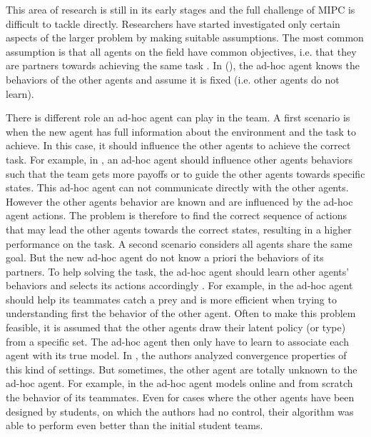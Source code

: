 This area of research is still in its early stages and the full challenge of MIPC is difficult to tackle directly. Researchers have started investigated only certain aspects of the larger problem by making suitable assumptions. The most common assumption is that all agents on the field have common objectives, i.e. that they are partners towards achieving the same task \cite{barrett2011empirical}.  In (\cite{stone2010teach,stone2013teaching}), the ad-hoc agent knows the behaviors of the other agents and assume it is fixed (i.e. other agents do not learn). 

There is different role an ad-hoc agent can play in the team. A first scenario is when the new agent has full information about the environment and the task to achieve. In this case, it should influence the other agents to achieve the correct task. For example, in  \cite{stone2010teach,stone2013teaching}, an ad-hoc agent should influence other agents behaviors such that the team gets more payoffs or to guide the other agents towards specific states. This ad-hoc agent can not communicate directly with the other agents. However the other agents behavior are known and are influenced by the ad-hoc agent actions. The problem is therefore to find the correct sequence of actions that may lead the other agents towards the correct states, resulting in a higher performance on the task. A second scenario considers all agents share the same goal. But the new ad-hoc agent do not know a priori the behaviors of its partners. To help solving the task, the ad-hoc agent should learn other agents' behaviors and selects its actions accordingly  \cite{barrett2011adhoc,barrett2011empirical,barrett2013team}. For example, in \cite{barrett2011empirical} the ad-hoc agent should help its teammates catch a prey and is more efficient when trying to understanding first the behavior of the other agent. Often to make this problem feasible, it is assumed that the other agents draw their latent policy (or type) from a specific set. The ad-hoc agent then only have to learn to associate each agent with its true model. In \cite{albrecht2014uai}, the authors analyzed convergence properties of this kind of settings. But sometimes, the other agent are totally unknown to the ad-hoc agent. For example, in \cite{barrett2011empirical} the ad-hoc agent models online and from scratch the behavior of its teammates. Even for cases where the other agents have been designed by students, on which the authors had no control, their algorithm was able to perform even better than the initial student teams.

